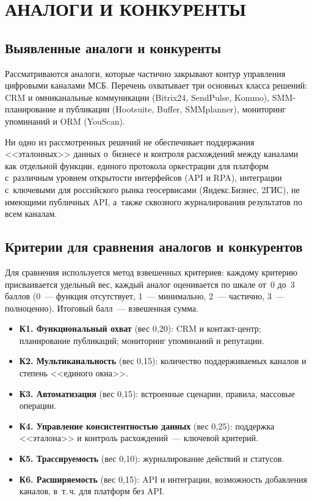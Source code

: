\chapter{{\fontsize{14pt}{21pt}\selectfont\MakeUppercase{Аналоги и конкуренты}}}
\label{ch:analogues}

\section{Выявленные аналоги и конкуренты}

Рассматриваются аналоги, которые частично закрывают контур управления цифровыми каналами МСБ. Перечень охватывает три основных класса решений: CRM и омниканальные коммуникации (Bitrix24, SendPulse, Kommo), SMM-планирование и публикации (Hootsuite, Buffer, SMMplanner), мониторинг упоминаний и ORM (YouScan).

Ни одно из рассмотренных решений не обеспечивает поддержания <<эталонных>> данных о~бизнесе и контроля расхождений между каналами как отдельной функции, единого протокола оркестрации для платформ с~различным уровнем открытости интерфейсов (API и RPA), интеграции с~ключевыми для российского рынка геосервисами (Яндекс.Бизнес, 2ГИС), не имеющими публичных API, а~также сквозного журналирования результатов по всем каналам.

\section{Критерии для сравнения аналогов и конкурентов}

Для сравнения используется метод взвешенных критериев: каждому критерию присваивается удельный вес, каждый аналог оценивается по шкале от~0 до~3 баллов (0~--- функция отсутствует, 1~--- минимально, 2~--- частично, 3~--- полноценно). Итоговый балл~--- взвешенная сумма.

\begin{itemize}
  \item \textbf{К1. Функциональный охват} (вес 0{,}20): CRM и контакт-центр; планирование публикаций; мониторинг упоминаний и репутации.
  \item \textbf{К2. Мультиканальность} (вес 0{,}15): количество поддерживаемых каналов и степень <<единого окна>>.
  \item \textbf{К3. Автоматизация} (вес 0{,}15): встроенные сценарии, правила, массовые операции.
  \item \textbf{К4. Управление консистентностью данных} (вес 0{,}25): поддержка <<эталона>> и контроль расхождений~--- ключевой критерий.
  \item \textbf{К5. Трассируемость} (вес 0{,}10): журналирование действий и статусов.
  \item \textbf{К6. Расширяемость} (вес 0{,}15): API и интеграции, возможность добавления каналов, в~т.\,ч. для платформ без API.
\end{itemize}

